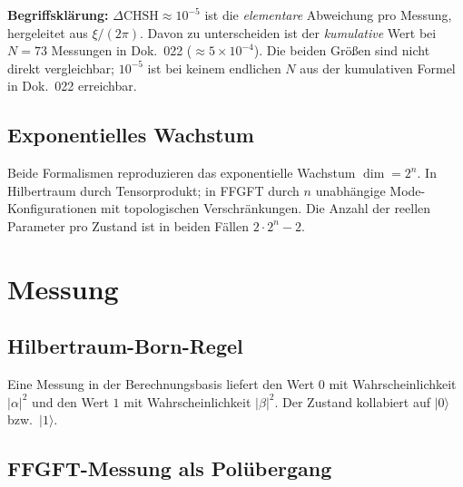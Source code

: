 \textbf{Begriffsklärung:} $\Delta\text{CHSH} \approx 10^{-5}$ ist die
\emph{elementare} Abweichung pro Messung, hergeleitet aus $\xi/(2\pi)$.
Davon zu unterscheiden ist der \emph{kumulative} Wert bei $N = 73$
Messungen in Dok.~022 ($\approx 5 \times 10^{-4}$). Die beiden Größen
sind nicht direkt vergleichbar; $10^{-5}$ ist bei keinem endlichen $N$
aus der kumulativen Formel in Dok.~022 erreichbar.

\subsection{Exponentielles Wachstum}

Beide Formalismen reproduzieren das exponentielle Wachstum
$\dim = 2^n$. In Hilbertraum durch Tensorprodukt; in FFGFT durch
$n$ unabhängige Mode-Konfigurationen mit topologischen Verschränkungen.
Die Anzahl der reellen Parameter pro Zustand ist in beiden Fällen
$2 \cdot 2^n - 2$.

\section{Messung}

\subsection{Hilbertraum-Born-Regel}

Eine Messung in der Berechnungsbasis liefert den Wert $0$ mit
Wahrscheinlichkeit $|\alpha|^2$ und den Wert $1$ mit
Wahrscheinlichkeit $|\beta|^2$. Der Zustand kollabiert auf
$|0\rangle$ bzw.\ $|1\rangle$.

\subsection{FFGFT-Messung als Polübergang}

